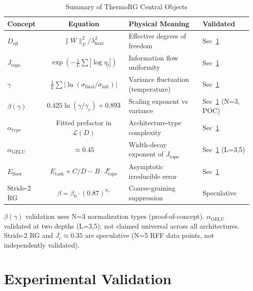 \documentclass[11pt, a4paper]{article}
\theoremstyle{plain}
\begin{document}
\begin{table}[htbp]
\caption{Summary of ThermoRG Central Objects}
\label{tab:thermorg-summary}
\begin{center}
\begin{tabular}{lcll}
\toprule
Concept & Equation & Physical Meaning & Validated \\
\midrule
$D_{\mathrm{eff}}$ & $\|W\|_F^2 / \lambda_{\max}^2$ & Effective degrees of freedom & Sec~\ref{sec:validation} \\
$J_{\mathrm{topo}}$ & $\exp(-\frac{1}{L}\sum|\log\eta_l|)$ & Information flow uniformity & Sec~\ref{sec:validation} \\
$\gamma$ & $\frac{1}{L}\sum|\ln(\sigma_{\mathrm{final}}/\sigma_{\mathrm{init}})|$ & Variance fluctuation (temperature) & Sec~\ref{sec:validation} \\
$\beta(\gamma)$ & $0.425\ln(\gamma/\gamma_c) + 0.893$ & Scaling exponent vs variance & Sec~\ref{sec:validation} (N=3, POC) \\
$\alpha_{\mathrm{type}}$ & Fitted prefactor in $\mathcal{L}(D)$ & Architecture-type complexity & Sec~\ref{sec:validation} \\
$\alpha_{\mathrm{GELU}}$ & $\approx 0.45$ & Width-decay exponent of $J_{\mathrm{topo}}$ & Sec~\ref{sec:validation} (L=3,5) \\
$E_{\mathrm{floor}}$ & $E_{\mathrm{task}} + C/D - B \cdot J_{\mathrm{topo}}^{\nu}$ & Asymptotic irreducible error & Sec~\ref{sec:validation} \\
Stride-2 RG & $\beta = \beta_0 \cdot (0.87)^{n_s}$ & Coarse-graining suppression & Speculative \\
\bottomrule
\end{tabular}
\end{center}
{\small * $\beta(\gamma)$ validation uses N=3 normalization types (proof-of-concept). $\alpha_{\mathrm{GELU}}$ validated at two depths (L=3,5); not claimed universal across all architectures. Stride-2 RG and $J_c \approx 0.35$ are speculative (N=5 RFF data points, not independently validated).}

\end{table}

\section{Experimental Validation}\label{sec:validation}
\end{document}
